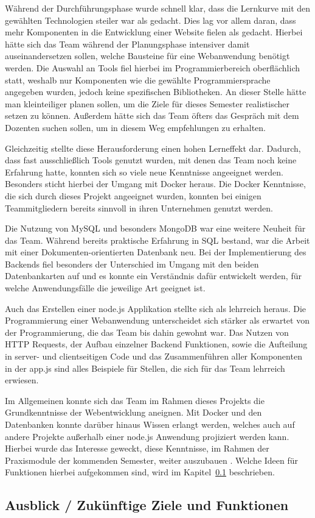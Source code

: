 Während der Durchführungsphase wurde schnell klar, dass die Lernkurve mit den gewählten Technologien steiler war als gedacht.
Dies lag vor allem daran, dass mehr Komponenten in die Entwicklung einer Website fielen als gedacht.
Hierbei hätte sich das Team während der Planungsphase intensiver damit auseinandersetzen sollen, welche Bausteine für eine Webanwendung benötigt werden.
Die Auswahl an Tools fiel hierbei im Programmierbereich oberflächlich statt, weshalb nur Komponenten wie die gewählte Programmiersprache angegeben wurden, jedoch keine spezifischen Bibliotheken.
An dieser Stelle hätte man kleinteiliger planen sollen, um die Ziele für dieses Semester realistischer setzen zu können.
Außerdem hätte sich das Team öfters das Gespräch mit dem Dozenten suchen sollen, um in diesem Weg empfehlungen zu erhalten.

Gleichzeitig stellte diese Herausforderung einen hohen Lerneffekt dar.
Dadurch, dass fast ausschließlich Tools genutzt wurden, mit denen das Team noch keine Erfahrung hatte, konnten sich so viele neue Kenntnisse angeeignet werden.
Besonders sticht hierbei der Umgang mit Docker heraus.
Die Docker Kenntnisse, die sich durch dieses Projekt angeeignet wurden, konnten bei einigen Teammitgliedern bereits sinnvoll in ihren Unternehmen genutzt werden.

Die Nutzung von MySQL und besonders MongoDB war eine weitere Neuheit für das Team.
Während bereits praktische Erfahrung in SQL bestand, war die Arbeit mit einer Dokumenten-orientierten Datenbank neu.
Bei der Implementierung des Backends fiel besonders der Unterschied im Umgang mit den beiden Datenbankarten auf und es konnte ein Verständnis dafür entwickelt werden, für welche Anwendungsfälle die jeweilige Art geeignet ist.

Auch das Erstellen einer node.js Applikation stellte sich als lehrreich heraus.
Die Programmierung einer Webanwendung unterscheidet sich stärker als erwartet von der Programmierung, die das Team bis dahin gewohnt war.
Das Nutzen von HTTP Requests, der Aufbau einzelner Backend Funktionen, sowie die Aufteilung in server- und clientseitigen Code und das Zusammenführen aller Komponenten in der app.js sind alles Beispiele für Stellen, die sich für das Team lehrreich erwiesen.

Im Allgemeinen konnte sich das Team im Rahmen dieses Projekts die Grundkenntnisse der Webentwicklung aneignen.
Mit Docker und den Datenbanken konnte darüber hinaus Wissen erlangt werden, welches auch auf andere Projekte außerhalb einer node.js Anwendung projiziert werden kann.
Hierbei wurde das Interesse geweckt, diese Kenntnisse, im Rahmen der Praxismodule der kommenden Semester, weiter auszubauen .
Welche Ideen für Funktionen hierbei aufgekommen sind, wird im Kapitel~\ref{subsec:ausblick-zukuenftige-ziele-und-funktionen} beschrieben.

\subsection{Ausblick / Zukünftige Ziele und Funktionen}\label{subsec:ausblick-zukuenftige-ziele-und-funktionen}